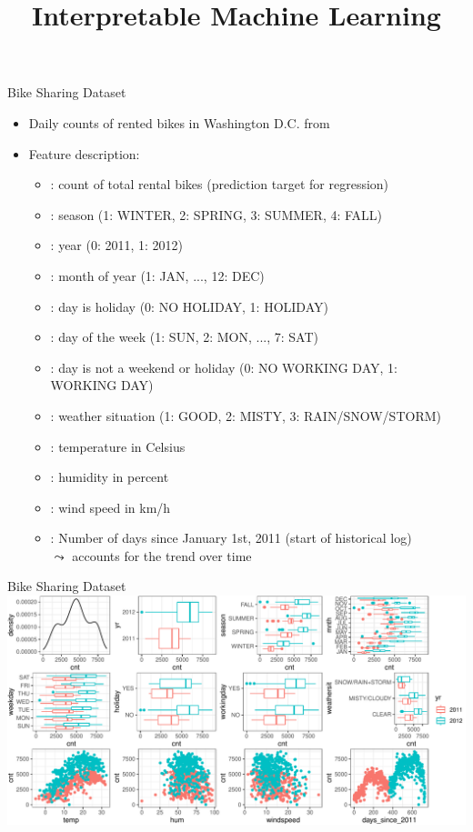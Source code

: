 \documentclass[11pt,compress,t,notes=noshow, aspectratio=169, xcolor=table]{beamer}
\title{Interpretable Machine Learning}
\date{}
\begin{document}
\newcommand{\titlefigure}{figure/open_blackbox}
\newcommand{\learninggoals}{
\item Introduce bike sharing data
\item Description of features
\item EDA of features}


\begin{frame}[t]{Bike Sharing Dataset }
\begin{itemize}
\item Daily counts of rented bikes in Washington D.C. from 
\item Feature description:
\begin{itemize}
\item {}: count of total rental bikes (prediction target for regression)
\item {}: season (1: WINTER, 2: SPRING, 3: SUMMER, 4: FALL)
\item {}: year (0: 2011, 1: 2012)
\item {}: month of year (1: JAN, ..., 12: DEC)
\item {}: day is holiday (0: NO HOLIDAY, 1: HOLIDAY)
\item {}: day of the week (1: SUN, 2: MON, ..., 7: SAT)
\item {}: day is not a weekend or holiday (0: NO WORKING DAY, 1: WORKING DAY)
\item {}: weather situation (1: GOOD, 2: MISTY, 3: RAIN/SNOW/STORM)
\item {}: temperature in Celsius
\item {}: humidity in percent
\item {}: wind speed in km/h
\item {}: Number of days since January 1st, 2011 (start of historical log)\\
$\leadsto$ accounts for the trend over time
\end{itemize}
\end{itemize}
\end{frame}


\begin{frame}[t]{Bike Sharing Dataset}
\includegraphics[width=\linewidth]{figure/intro_bike}
\end{frame}

\endlecture
\end{document}
